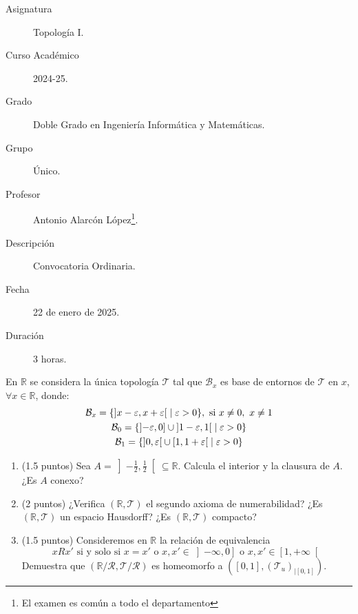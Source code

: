 \documentclass[12pt]{article}
\begin{document}

    
    

    \begin{description}
        \item[Asignatura] Topología I.
        \item[Curso Académico] 2024-25.
        \item[Grado] Doble Grado en Ingeniería Informática y Matemáticas.
        \item[Grupo] Único.
        \item[Profesor] Antonio Alarcón López\footnote{El examen es común a todo el departamento}.
        \item[Descripción] Convocatoria Ordinaria.
        \item[Fecha] 22 de enero de 2025.
        \item[Duración] 3 horas.
    
    \end{description}
    \newpage

    \begin{ejercicio}
        En $\mathbb{R}$ se considera la única topología $\mathcal{T}$ tal que $\mathcal{B}_x$ es base de entornos de $\mathcal{T}$ en $x$, $\forall x\in \mathbb{R}$, donde:
        \begin{gather*}
            \mathcal{B}_x = \{\left]x-\varepsilon,x+\varepsilon\right[ \mid \varepsilon > 0\}, \text{\ si\ } x\neq 0,\ x\neq 1 \\
        \mathcal{B}_0 = \{\left]-\varepsilon, 0\right] \cup \left]1-\varepsilon, 1\right[ \mid \varepsilon > 0\} \\
        \mathcal{B}_1 = \{\left]0,\varepsilon\right[\cup \left[1,1+\varepsilon\right[\mid \varepsilon > 0\}
        \end{gather*}
        \begin{enumerate}[label=(\alph*)]
            \item (1.5 puntos) Sea $A = \left]-\frac{1}{2},\frac{1}{2}\right[\subseteq \mathbb{R}$. Calcula el interior y la clausura de $A$. ¿Es $A$ conexo?
            \item (2 puntos) ¿Verifica $(\mathbb{R}, \mathcal{T})$ el segundo axioma de numerabilidad? ¿Es $(\mathbb{R}, \mathcal{T})$ un espacio Hausdorff? ¿Es $(\mathbb{R}, \mathcal{T})$ compacto?
            \item (1.5 puntos) Consideremos en $\mathbb{R}$ la relación de equivalencia
                \begin{equation*}
                xRx' \text{\ si y solo si\ } x=x' \text{\ o\ }x,x'\in \left]-\infty,0\right] \text{\ o\ } x,x' \in \left[1,+\infty\right[
                \end{equation*}
                Demuestra que $(\mathbb{R}/\mathcal{R}, \mathcal{T}/\mathcal{R})$ es homeomorfo a $([0,1], {(\mathcal{T}_u)}_{|[0,1]})$.
        \end{enumerate}
    \end{ejercicio}
\end{document}
